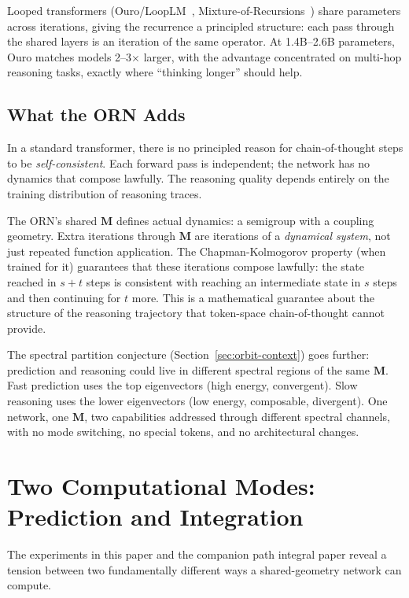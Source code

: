 \documentclass[11pt, a4paper]{article}
\newcommand{\M}{\mathbf{M}}
\theoremstyle{plain}
\theoremstyle{definition}
\theoremstyle{remark}
\begin{document}
Looped transformers (Ouro/LoopLM~\cite{ouro2025}, Mixture-of-Recursions~\cite{mor2025}) share parameters across iterations, giving the recurrence a principled structure: each pass through the shared layers is an iteration of the same operator.
At 1.4B--2.6B parameters, Ouro matches models 2--3$\times$ larger, with the advantage concentrated on multi-hop reasoning tasks, exactly where ``thinking longer'' should help.

\subsection{What the ORN Adds}

In a standard transformer, there is no principled reason for chain-of-thought steps to be \emph{self-consistent}.
Each forward pass is independent; the network has no dynamics that compose lawfully.
The reasoning quality depends entirely on the training distribution of reasoning traces.

The ORN's shared $\M$ defines actual dynamics: a semigroup with a coupling geometry.
Extra iterations through $\M$ are iterations of a \emph{dynamical system}, not just repeated function application.
The Chapman-Kolmogorov property (when trained for it) guarantees that these iterations compose lawfully: the state reached in $s{+}t$ steps is consistent with reaching an intermediate state in $s$ steps and then continuing for $t$ more.
This is a mathematical guarantee about the structure of the reasoning trajectory that token-space chain-of-thought cannot provide.

The spectral partition conjecture (Section~\ref{sec:orbit-context}) goes further: prediction and reasoning could live in different spectral regions of the same $\M$.
Fast prediction uses the top eigenvectors (high energy, convergent).
Slow reasoning uses the lower eigenvectors (low energy, composable, divergent).
One network, one $\M$, two capabilities addressed through different spectral channels, with no mode switching, no special tokens, and no architectural changes.

\section{Two Computational Modes: Prediction and Integration}\label{sec:two-modes}

The experiments in this paper and the companion path integral paper reveal a tension between two fundamentally different ways a shared-geometry network can compute.
\end{document}

